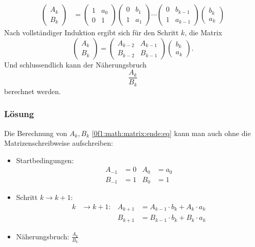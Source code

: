 \begin{align*}
	\begin{pmatrix}
		A_k\\
		B_k
	\end{pmatrix}
	&=
	\begin{pmatrix}
		1& a_0\\
		0& 1
	\end{pmatrix}
	\begin{pmatrix}
		0& b_1\\
		1& a_1
	\end{pmatrix}
	\cdots
	\begin{pmatrix}
		0& b_{k-1}\\
		1& a_{k-1}
	\end{pmatrix}
	\begin{pmatrix}
		b_k\\
		a_k
	\end{pmatrix}
\end{align*}
Nach vollständiger Induktion ergibt sich für den Schritt $k$, die Matrix
\begin{equation}
	\label{0f1:math:matrix:ende:eq}
	 \begin{pmatrix}
		A_{k}\\
		B_{k}			
	\end{pmatrix} 
	=
		\begin{pmatrix}
		A_{k-2}& A_{k-1}\\
		B_{k-2}& B_{k-1}			
	\end{pmatrix}
		\begin{pmatrix}
		b_k\\
		a_k
	\end{pmatrix}.
\end{equation}
Und schlussendlich kann der Näherungsbruch
\[
\frac{A_k}{B_k}
\] 
berechnet werden.


\subsubsection{Lösung}
Die Berechnung von $A_k, B_k$ \eqref{0f1:math:matrix:ende:eq} kann man auch ohne die Matrizenschreibweise \cite{0f1:kettenbrueche} aufschreiben:
\begin{itemize}
\item Startbedingungen:
\begin{align*}
A_{-1} &= 0		&		A_0 &= a_0 \\
B_{-1} &= 1		&		B_0 &= 1 
\end{align*}
\item Schritt $k\to k+1$:
\[
\begin{aligned}
\label{0f1:math:loesung:eq}
k &\rightarrow k + 1:
&
A_{k+1} &= A_{k-1} \cdot b_k + A_k \cdot a_k \\
&&
B_{k+1} &= B_{k-1} \cdot b_k + B_k \cdot a_k
\end{aligned}
\]
\item
Näherungsbruch: \qquad$\displaystyle\frac{A_k}{B_k}$
\end{itemize}


